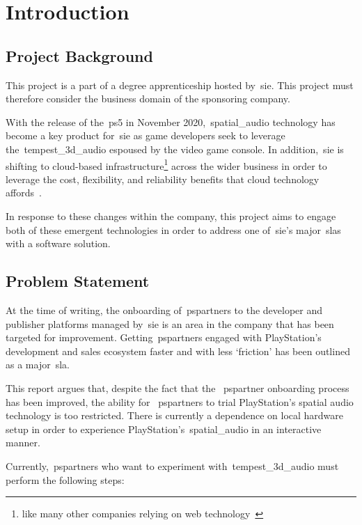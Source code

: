 \thispagestyle{plain}
\newpage
\section{Introduction}\label{sec:introduction}
\subsection{Project Background}\label{subsec:project-background}
\normalsize

This project is a part of a degree apprenticeship hosted by~\gls{sie}.
This project must therefore consider the business domain of the sponsoring company.

With the release of the~\gls{ps5} in November 2020,~\gls{spatial_audio} technology has become a key product for~\gls{sie} as game developers seek to leverage the~\gls{tempest_3d_audio} espoused by the video game console.
In addition,~\gls{sie} is shifting to cloud-based infrastructure\footnote{like many other companies relying on web technology~\citep{cc_overview}} across the wider business in order to leverage the cost, flexibility, and reliability benefits that cloud technology affords~\citep{cc_overview}.

In response to these changes within the company, this project aims to engage both of these emergent technologies in order to address one of~\gls{sie}'s major~\glspl{sla} with a software solution.

\subsection{Problem Statement}\label{subsec:problem-statement}

At the time of writing, the onboarding of~\glspl{pspartner} to the developer and publisher platforms managed by~\gls{sie} is an area in the company that has been targeted for improvement.
Getting~\glspl{pspartner} engaged with PlayStation's development and sales ecosystem faster and with less `friction' has been outlined as a major~\gls{sla}.

This report argues that, despite the fact that the ~\gls{pspartner} onboarding process has been improved, the ability for ~\glspl{pspartner} to trial PlayStation's spatial audio technology is too restricted.
There is currently a dependence on local hardware setup in order to experience PlayStation's~\gls{spatial_audio} in an interactive manner.

Currently,~\glspl{pspartner} who want to experiment with~\gls{tempest_3d_audio} must perform the following steps:

